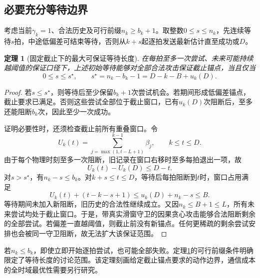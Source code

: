 \documentclass[UTF8,a4paper,zihao=5,fontset=windows]{ctexart}
\newtheorem{theorem}{定理}
\begin{document}
\subsection{必要充分等待边界}
考虑当前$\gamma_k=1$、合法历史及可行前缀$n_k\ge b_k+1$。取整数$0\le s\le n_k$，先连续等待$s$拍，中途低偏差可结束等待，否则从$k+s$起逐拍发送最新估计直至成功或$D$。

\begin{theorem}[固定截止下的最大可保证等待长度]\label{thm:sharp}
在每拍至多一次尝试、未来可能持续越阈值的保证口径下，上述初始等待能够对全部合法攻击保证截止锚点，当且仅当
\begin{equation}
0\le s\le s^\star,\qquad
s^\star=n_k-b_k-1=D-k-B+u_k(D).
\label{eq:sharp}
\end{equation}
\end{theorem}
\begin{proof}
若$s\le s^\star$，则等待后至少保留$b_k+1$次尝试机会。若期间形成低偏差锚点，截止要求已满足。否则这些尝试全部位于截止窗口，已有$u_k(D)$次阻断后，至多还能阻断$b_k$次，因此至少一次成功。

证明必要性时，还须检查截止前所有重叠窗口。令
\[
U_k(t)=\sum_{j=\max(1,t-L+1)}^{k-1}\beta_j,\qquad k\le t\le D.
\]
由于每个物理时刻至多一次阻断，旧记录在窗口右移时至多每拍退出一项，故
\begin{equation}
U_k(t)-U_k(D)\le D-t.
\label{eq:overlap}
\end{equation}
对$s>s^\star$，有$n_k-s\le b_k$。对$k+s\le t\le D$，等待后每拍阻断到$t$时，窗口占用满足
\begin{equation}
U_k(t)+(t-k-s+1)\le u_k(D)+n_k-s\le B.
\label{eq:extension}
\end{equation}
等待期间未加入新阻断，旧历史的合法性继续成立。又因$n_k\le B+1\le L$，所有未来尝试均处于截止窗口。于是，带真实滑窗守卫的因果贪心攻击能够合法阻断剩余的全部尝试。若偏差一直越阈值，则截止前没有新锚点。任何更稀疏的剩余尝试安排也会被同一守卫阻断，故无法扩大该保证范围。
\end{proof}

若$n_k\le b_k$，即使立即开始逐拍尝试，也可能全部失败。定理\ref{thm:sharp}的可行前缀条件明确限定了等待长度的讨论范围。该定理刻画给定截止锚点要求的动作边界，通信成本的全时域最优性需要另行研究。
\end{document}
